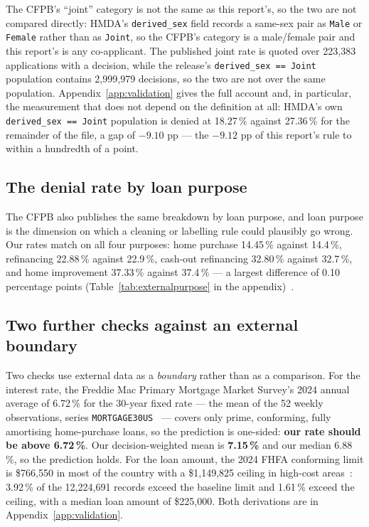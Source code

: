 \documentclass[sigconf,balance=false]{acmart}
\begin{document}
The CFPB's ``joint'' category is not the same as this report's, so the two
are not compared directly: HMDA's \texttt{derived\_\allowbreak sex} field
records a same-sex pair as \texttt{Male} or \texttt{Female} rather than
as \texttt{Joint}, so the CFPB's category is a male/female pair and this
report's is any co-applicant. The published joint rate is quoted over
223{,}383 applications with a decision, while the release's
\texttt{derived\_\allowbreak sex == Joint} population contains
2{,}999{,}979 decisions, so the two are not over the same population.
Appendix~\ref{app:validation} gives the full account and, in particular,
the measurement that does not depend on the definition at all: HMDA's own
\texttt{derived\_\allowbreak sex == Joint} population is denied at
18.27\,\% against 27.36\,\% for the remainder of the file, a gap of
$-9.10$ pp --- the $-9.12$ pp of this report's rule to within a hundredth
of a point.

\subsection{The denial rate by loan purpose}

The CFPB also publishes the same breakdown by loan purpose, and loan purpose
is the dimension on which a cleaning or labelling rule could plausibly go
wrong. Our rates match on all four purposes: home purchase 14.45\,\% against
14.4\,\%, refinancing 22.88\,\% against 22.9\,\%, cash-out refinancing
32.80\,\% against 32.7\,\%, and home improvement 37.33\,\% against
37.4\,\% --- a largest difference of 0.10 percentage points
(Table~\ref{tab:externalpurpose} in the appendix)~\cite{cpb}.

\subsection{Two further checks against an external boundary}

Two checks use external data as a \emph{boundary} rather than as a
comparison. For the interest rate, the Freddie Mac Primary Mortgage
Market Survey's 2024 annual average of 6.72\,\% for the 30-year fixed
rate --- the mean of the 52 weekly observations, series
\texttt{MORTGAGE30US}~\cite{pmms} --- covers only prime, conforming,
fully amortising home-purchase loans, so the prediction is one-sided:
\textbf{our rate should be above 6.72\,\%}. Our decision-weighted mean
is \textbf{7.15\,\%} and our median 6.88\,\%, so the prediction holds.
For the loan amount, the 2024 FHFA conforming limit is \$766{,}550 in
most of the country with a \$1{,}149{,}825 ceiling in high-cost
areas~\cite{fhfa}: 3.92\,\% of the 12{,}224{,}691 records exceed the
baseline limit and 1.61\,\% exceed the ceiling, with a median loan
amount of \$225{,}000. Both derivations are in
Appendix~\ref{app:validation}.
\end{document}
